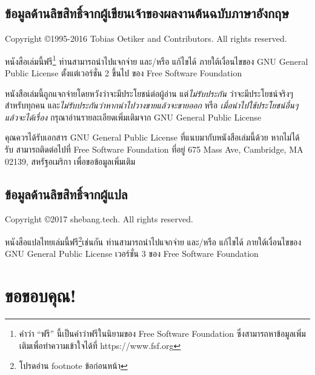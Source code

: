 \section*{ข้อมูลด้านลิขสิทธิ์จากผู้เขียนเจ้าของผลงานต้นฉบับภาษาอังกฤษ}

Copyright \copyright 1995-2016 Tobias Oetiker and
Contributors.  All rights reserved.

หนังสือเล่มนี้ฟรี\footnote{คำว่า ``ฟรี'' นี้เป็นคำว่าฟรีในนิยามของ Free Software
Foundation ซึ่งสามารถหาข้อมูลเพิ่มเติมเพื่อทำความเข้าใจได้ที่ https://www.fsf.org}
ท่านสามารถนำไปแจกจ่าย และ/หรือ แก้ไขได้ ภายใต้เงื่อนไขของ GNU General Public
License ตั้งแต่เวอร์ชั่น 2 ขึ้นไป ของ Free Software Foundation 

หนังสือเล่มนี้ถูกแจกจ่ายโดยหวังว่าจะมีประโยชน์ต่อผู้อ่าน แต่\emph{ไม่รับประกัน}
ว่าจะมีประโยชน์จริงๆสำหรับทุกคน และ\emph{ไม่รับประกันว่าหากนำไปวางขายแล้วจะขายออก}
หรือ \emph{เมื่อนำไปใช้ประโยชน์อื่นๆแล้วจะได้เรื่อง} กรุณาอ่านรายละเอียดเพิ่มเติมจาก GNU
General Public License

คุณควรได้รับเอกสาร GNU General Public License ที่แนบมากับหนังสือเล่มนี้ด้วย หากไม่ได้
รับ สามารถติดต่อไปที่ Free Software Foundation ที่อยู่ 675 Mass Ave, Cambridge,
MA 02139, สหรัฐอเมริกา เพื่อขอข้อมูลเพิ่มเติม

\section*{ข้อมูลด้านลิขสิทธิ์จากผู้แปล}

Copyright \copyright 2017 shebang.tech.  All rights reserved.

หนังสือแปลไทยเล่มนี้ฟรี\footnote{โปรดอ่าน footnote ข้อก่อนหน้า}เช่นกัน
ท่านสามารถนำไปแจกจ่าย และ/หรือ แก้ไขได้ ภายใต้เงื่อนไขของ GNU General Public
License เวอร์ชั่น 3 ของ Free Software Foundation

\chapter{ขอขอบคุณ!}
\shbtoaddmoretranslation
